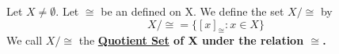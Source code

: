 \label{def:QuotientSet}
\newcommand{\QuotientSet}[0]{
    \bf \hyperref[def:QuotientSet]{Quotient Set} \rm
}
\newcommand{\QuoSet}[2]{
    #1
    /
    #2
}
\newcommand{\LetBeQuotientSet}[2]{
    Let \QuoSet{#1}{#2} be the \QuotientSet of #1 with respect to the relation #2.
}
\begin{df}  
    Let $X \neq \emptyset$.
    Let $\cong$ be an 
	\EquivalenceRelation defined on X.
    We define the set $X/\cong$ by 
    \begin{equation}
        \QuoSet{X}{\cong} = \{ [x]_{\cong} : x \in X\}
    \end{equation}
    We call $\QuoSet{X}{\cong}$ the \QuotientSet of X under the relation $\cong$. 
\end{df} 
